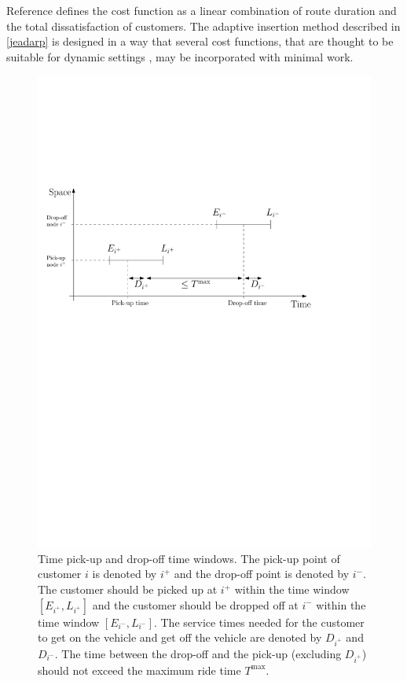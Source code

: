 \documentclass[dissertation,draft*]{aaltoseries}
\begin{document}
Reference \cite{psaraftis01} defines the cost function as a linear combination of route duration and the 
total dissatisfaction of customers. The adaptive insertion method described in \ref{jeadarp} is designed in a way 
that several cost functions, that are thought to be suitable for dynamic settings \cite{Hyytia2010}, may be incorporated with minimal work.

\begin{figure}[ht]
\begin{center}
\includegraphics[width=0.6 \columnwidth]{timeline01}
\caption{Time pick-up and drop-off time windows. The pick-up point of
customer $i$ is denoted by $i^{+}$ and the drop-off point is denoted by $i^{-}$.
The customer should be picked up at $i^{+}$ within the time window $[E_{i^+},L_{i^+}]$
and the customer should be dropped off at $i^{-}$ within the time window $[E_{i^{-}},L_{i^{-}}]$.
The service times needed for the customer to get on the vehicle
and get off the vehicle are denoted by $D_{i^+}$ and $D_{i^-}$. The time between
the drop-off and the pick-up (excluding $D_{i^+}$) should not exceed the maximum ride time $T^{\max}$.
}
\label{timeline01}
\end{center}
\end{figure}
\end{document}
